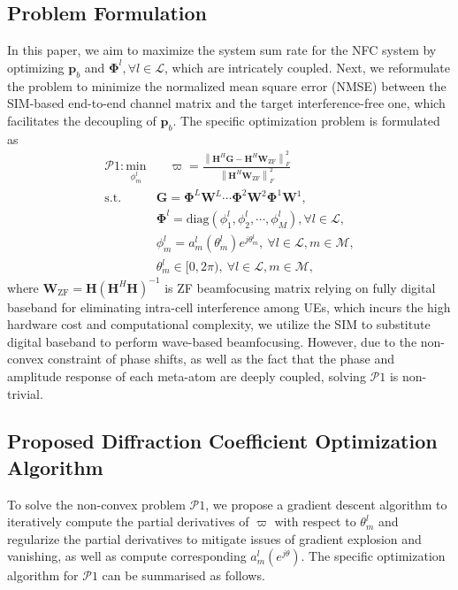 \documentclass[conference]{IEEEtran}
\theoremstyle{remark}
\begin{document}
\subsection{Problem Formulation}
In this paper, we aim to maximize the system sum rate for the NFC system by optimizing $\mathbf{p}_{b}$ and $\mathbf{\Phi}^{l}, {\forall}{l}\in\mathcal{L}$, which are intricately coupled.
Next, we reformulate the problem to minimize the normalized mean square error (NMSE) between the SIM-based end-to-end channel matrix and the target interference-free one, which facilitates the decoupling of $\mathbf{p}_{b}$. The specific optimization problem is formulated as 
\begin{subequations}\begin{align} 
\mathscr{P}1: \underset{ {\phi_{m}^{l}}} {\text{min}}& \quad {\varpi }= \frac{\left \| {\mathbf{H}^{H}\mathbf{G}} - \mathbf{H}^{H}\mathbf{W}_{\text{ZF}} \right \|_{F}^{2} }{\left \|\mathbf{H}^{H}\mathbf{W}_{\text{ZF}} \right \|_{F}^{2}} \label{min} \\
\text{s.t.} \quad & \mathbf{G}=\boldsymbol{\Phi}^{L} \mathbf{W}^{L} \cdots \boldsymbol{\Phi}^{2} \mathbf{W}^{2} \boldsymbol{\Phi}^{1} \mathbf{W}^{1}, \label{min_b} \\
 & \mathbf{\Phi}^{l}=\text{diag}\left( {\phi_{1}^{l}}, {\phi_{2}^{l}},\cdots,{\phi_{M}^{l}}\right), \forall l\in \mathcal{L}, \label{min_c} \\
 & {\phi_{m}^{l}} =a_{m}^{l}( {\theta}_{m}^{l}) e^{j{\theta}_{m}^{l}}, \ \forall l\in \mathcal{L}, m\in\mathcal{M}, \label{min_d} \\
 & {\theta}_{m}^{l}\in [0,2\pi),\ \forall l\in \mathcal{L},m\in \mathcal{M}, \label{min_e} 
\end{align}\end{subequations}
where $\mathbf{W}_{\text{ZF}} =\mathbf{H} \left({\mathbf{H}^{H}} {\mathbf{H}} \right)^{-1}$ is ZF beamfocusing matrix relying on fully digital baseband for eliminating intra-cell interference among UEs, which incurs the high hardware cost and computational complexity, we utilize the SIM to substitute digital baseband to perform wave-based beamfocusing.
However, due to the non-convex constraint of phase shifts, as well as the fact that the phase and amplitude response of each meta-atom are deeply coupled, solving $\mathscr{P}1$ is non-trivial.

\subsection{Proposed Diffraction Coefficient Optimization Algorithm}
To solve the non-convex problem $\mathscr{P}1$, we propose a gradient descent algorithm to iteratively compute the partial derivatives of ${\varpi}$ with respect to ${\theta}_{m}^{l}$ and regularize the partial derivatives to mitigate issues of gradient explosion and vanishing, as well as compute corresponding ${a}_{m}^{l}(e^{j\theta})$.
The specific optimization algorithm for $\mathscr{P}1$ can be summarised as follows.
\end{document}

